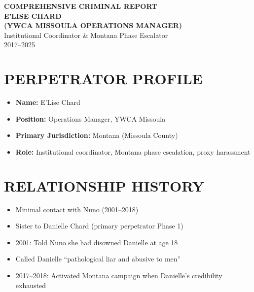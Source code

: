 \documentclass[12pt,oneside]{article}
\begin{document}
\begin{center}

{\textbf{\large COMPREHENSIVE CRIMINAL REPORT}} \\

{\textbf{E'LISE CHARD}} \\

{\textbf{(YWCA MISSOULA OPERATIONS MANAGER)}} \\

Institutional Coordinator \& Montana Phase Escalator \\

2017--2025

\end{center}

\vspace{0.3in}

\section*{PERPETRATOR PROFILE}

\begin{itemize}

\item \textbf{Name:} E'Lise Chard

\item \textbf{Position:} Operations Manager, YWCA Missoula

\item \textbf{Primary Jurisdiction:} Montana (Missoula County)

\item \textbf{Role:} Institutional coordinator, Montana phase escalation, proxy harassment

\end{itemize}

\section*{RELATIONSHIP HISTORY}

\begin{itemize}

\item Minimal contact with Nuno (2001--2018)

\item Sister to Danielle Chard (primary perpetrator Phase 1)

\item 2001: Told Nuno she had disowned Danielle at age 18

\item Called Danielle ``pathological liar and abusive to men''

\item 2017--2018: Activated Montana campaign when Danielle's credibility exhausted

\end{itemize}
\end{document}
